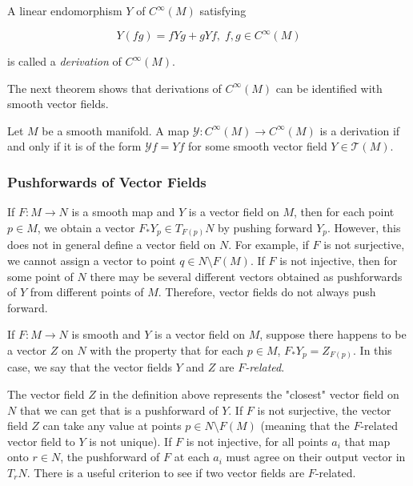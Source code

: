 \documentclass{article}
\newcounter{theorem}[section]
\newcounter{definition}[section]
\newcounter{example}[section]
\begin{document}
    \begin{definition}
      \label{def:derivation-of-cinftym}
      A linear endomorphism $Y$ of $C^\infty (M)$ satisfying 

        \begin{equation}
          Y(f g) = f Y g + g Y f, \; f, g \in C^\infty(M)
        \end{equation}

      is called a \textit{derivation} of $C^\infty (M)$. 
    \end{definition}

    The next theorem shows that derivations of $C^\infty (M)$ can be identified with smooth vector fields. 

    \begin{theorem}
      \label{thm:vector-fields-as-derivations-of-cinftym}
      Let $M$ be a smooth manifold. A map $\mathcal{Y}: C^\infty (M) \to C^\infty (M)$ is a derivation if and only if it is of the form $\mathcal{Y} f = Y f$ for some smooth vector field $Y \in \mathcal{T}(M)$. 
    \end{theorem}

    \subsubsection{Pushforwards of Vector Fields}

      If $F: M \to N$ is a smooth map and $Y$ is a vector field on $M$, then for each point $p \in M$, we obtain a vector $F_* Y_p \in T_{F(p)} N$ by pushing forward $Y_p$. However, this does not in general define a vector field on $N$. For example, if $F$ is not surjective, we cannot assign a vector to point $q \in N \setminus F(M)$. If $F$ is not injective, then for some point of $N$ there may be several different vectors obtained as pushforwards of $Y$ from different points of $M$. Therefore, vector fields do not always push forward. 

      \begin{definition}
        \label{def:f-related-vector-fields}
        If $F: M \to N$ is smooth and $Y$ is a vector field on $M$, suppose there happens to be a vector $Z$ on $N$ with the property that for each $p \in M$, $F_* Y_p = Z_{F(p)}$. In this case, we say that the vector fields $Y$ and $Z$ are \textit{$F$-related}. 
      \end{definition}

      The vector field $Z$ in the definition above represents the "closest" vector field on $N$ that we can get that is a pushforward of $Y$. If $F$ is not surjective, the vector field $Z$ can take any value at points $p \in N \setminus F(M)$ (meaning that the $F$-related vector field to $Y$ is not unique). If $F$ is not injective, for all points $a_i$ that map onto $r \in N$, the pushforward of $F$ at each $a_i$ must agree on their output vector in $T_r N$. There is a useful criterion to see if two vector fields are $F$-related. 
\end{document}
